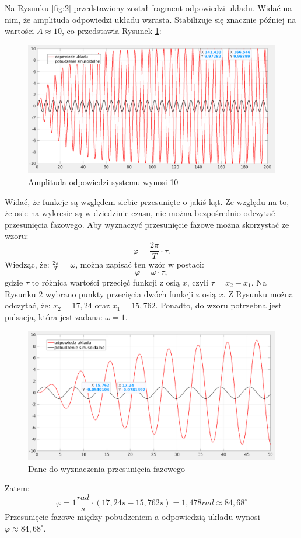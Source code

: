 \documentclass[12pt]{article}
\begin{document}
Na Rysunku \ref{fig:2} przedstawiony został fragment odpowiedzi układu. Widać na nim, że amplituda odpowiedzi układu wzrasta. Stabilizuje się znacznie później na wartości $A \approx 10$, co przedstawia Rysunek \ref{fig:2.22}:
\begin{figure}[H]
    \centering
    \includegraphics[scale=0.2]{2.22.png}
    \caption{Amplituda odpowiedzi systemu wynosi 10}
    \label{fig:2.22}
\end{figure}

Widać, że funkcje są względem siebie przesunięte o jakiś kąt. Ze względu na to, że osie na wykresie są w dziedzinie czasu, nie można bezpośrednio odczytać przesunięcia fazowego. Aby wyznaczyć przesunięcie fazowe można skorzystać ze wzoru:
\begin{equation}
    \varphi = \frac{2 \pi}{T} \cdot \tau.
\end{equation}
Wiedząc, że: $\frac{2 \pi}{T} = \omega$, można zapisać ten wzór w postaci:
\begin{equation}
    \varphi = \omega \cdot \tau,
\end{equation}
gdzie $\tau$ to różnica wartości przecięć funkcji z osią $x$, czyli $\tau = x_2 - x_1$. Na Rysunku \ref{fig:2.23} wybrano punkty przecięcia dwóch funkcji z osią $x$. Z Rysunku można odczytać, że: $x_2 = 17,24$ oraz $x_1 = 15,762$. Ponadto, do wzoru potrzebna jest pulsacja, która jest zadana: $\omega = 1$. 
\begin{figure}[H]
    \centering
    \includegraphics[scale=0.2]{2.23.png}
    \caption{Dane do wyznaczenia przesunięcia fazowego}
    \label{fig:2.23}
\end{figure}
Zatem:
\begin{equation}
    \varphi = 1 \frac{rad}{s} \cdot (17,24 s-15,762s) = 1,478 rad \approx 84,68 ^\circ
\end{equation}
Przesunięcie fazowe między pobudzeniem a odpowiedzią układu wynosi $\varphi \approx 84,68 ^\circ$.
\end{document}
